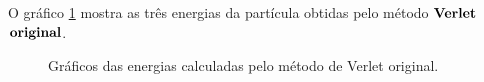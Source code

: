 \documentclass[a4wide]{report}
\begin{document}
\newpage

O gráfico \ref{gra7} mostra as três energias da partícula obtidas pelo método $\bf Verlet$ $\bf original$.

\begin{figure}[!ht]
\centering
{}\qquad 
{}\qquad 
{}\qquad 
\caption{Gráficos das energias calculadas pelo método de Verlet original.}
\label{gra7}
\end{figure}
\end{document}

